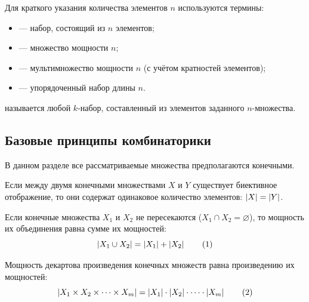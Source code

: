 \begin{designation}
    Для краткого указания количества элементов $n$ используются 
    термины:
    \begin{itemize}
        \item {} --- набор, состоящий из $n$ элементов;
        \item {} --- множество мощности $n$;
        \item {} --- мультимножество мощности $n$ 
        (с учётом кратностей элементов);
        \item {} --- упорядоченный набор длины $n$.
    \end{itemize}
\end{designation}

\begin{definition}
     называется любой $k$-набор, составленный из 
    элементов заданного $n$-множества.
\end{definition}

\subsection{Базовые принципы комбинаторики}

В данном разделе все рассматриваемые множества предполагаются конечными.

\begin{theorem}
    Если между двумя конечными множествами $X$ и $Y$ существует биективное 
    отображение, то они содержат одинаковое количество элементов: 
    $\left| X \right| = \left| Y \right|$.
\end{theorem}

\begin{theorem}
    Если конечные множества $X_1$ и $X_2$ не пересекаются 
    ($X_1 \cap X_2 = \varnothing$), то мощность их объединения равна сумме 
    их мощностей:
    \begin{equation} \label{eq:sum_rule}
        \left| X_1 \cup X_2 \right| = \left| X_1 \right| + \left| X_2 \right| \tag{1}
    \end{equation}
\end{theorem}

\begin{theorem}
    Мощность декартова произведения конечных множеств равна произведению 
    их мощностей:
    \begin{equation} \label{eq:prod_rule}
        \left| X_1 \times X_2 \times \dots \times X_m \right| = 
        \left| X_1 \right| \cdot \left| X_2 \right| \cdot \dots \cdot \left| X_m \right| \tag{2}
    \end{equation}
\end{theorem}

